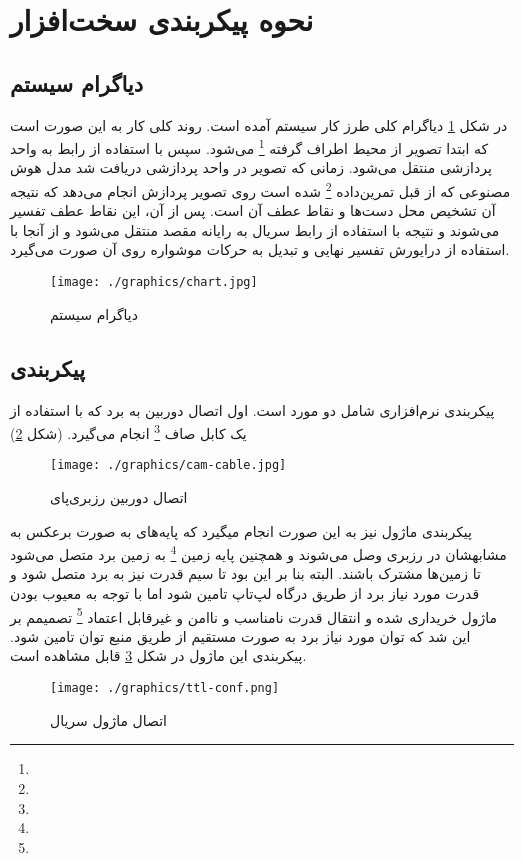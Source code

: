 \documentclass{article}
\begin{document}
\section{نحوه پیکر‌بندی سخت‌افزار}
\subsection{دیاگرام سیستم}
در شکل \ref{chart} دیاگرام کلی طرز کار سیستم‌ آمده است. روند کلی کار به این صورت است که
ابتدا تصویر از محیط اطراف گرفته \footnote{} می‌شود. سپس با استفاده از رابط  به واحد پردازشی منتقل می‌شود. زمانی که تصویر در واحد پردازشی دریافت شد مدل هوش
مصنوعی که از قبل تمرین‌داده \footnote{} شده است روی تصویر پردازش انجام می‌دهد که
نتیجه آن تشخیص محل دست‌ها و نقاط عطف آن است. پس از آن، این نقاط عطف تفسیر می‌شوند و نتیجه با
استفاده از رابط سریال به رایانه مقصد منتقل می‌شود و از آنجا با استفاده از درایورش  تفسیر
نهایی و تبدیل به حرکات موشواره روی آن صورت می‌گیرد.

\begin{figure}
	\centering
	\texttt{[image: ./graphics/chart.jpg]}
	\caption{دیاگرام سیستم}
	\label{chart}
\end{figure}


\subsection{پیکربندی}
پیکربندی نرم‌افزاری شامل دو مورد است. اول اتصال دوربین به برد که با استفاده از یک کابل صاف
\footnote{} انجام می‌گیرد.  (شکل \ref{cam-cable})

\begin{figure}
	\centering
	\texttt{[image: ./graphics/cam-cable.jpg]}
	\caption{اتصال دوربین رزبری‌پای}
	\label{cam-cable}
\end{figure}

پیکربندی ماژول  نیز به این صورت انجام میگیرد که پایه‌های  به صورت برعکس به مشابهشان در رزبری وصل می‌شوند و همچنین پایه‌ زمین \footnote{} به زمین برد
متصل می‌شود تا زمین‌ها مشترک باشند. البته بنا بر این بود تا سیم قدرت نیز به برد متصل شود و
قدرت مورد نیاز برد از طریق درگاه  لپ‌تاپ تامین شود اما با توجه به معیوب بودن ماژول
خریداری شده و انتقال قدرت نامناسب و ناامن و غیرقابل اعتماد \footnote{}
تصمیمم بر این شد که توان مورد نیاز برد به صورت مستقیم از طریق منبع توان تامین شود.
پیکربندی این ماژول در شکل \ref{ttl-conf} قابل مشاهده است.

\begin{figure}
	\centering
	\texttt{[image: ./graphics/ttl-conf.png]}
	\caption{اتصال ماژول سریال}
	\label{ttl-conf}
\end{figure}
\end{document}
